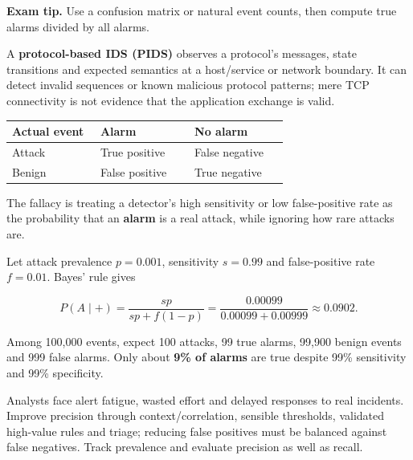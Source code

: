 \documentclass[11pt,a4paper]{article}
\begin{document}
{\color{ForestGreen}\textbf{Exam tip.} Use a confusion matrix or natural event counts,\allowbreak{} then compute true alarms divided by all alarms.}


A \textbf{protocol-based IDS (PIDS)} observes a protocol's messages,\allowbreak{} state transitions and expected semantics at a host/\allowbreak{}service or network boundary. It can detect invalid sequences or known malicious protocol patterns; mere TCP connectivity is not evidence that the application exchange is valid.



{\small\setlength{\tabcolsep}{3pt}
\begin{longtable}{>{\raggedright\arraybackslash}p{0.30327\linewidth}>{\raggedright\arraybackslash}p{0.32757\linewidth}>{\raggedright\arraybackslash}p{0.32757\linewidth}}
\toprule
\textbf{Actual event} & \textbf{Alarm} & \textbf{No alarm} \\
\midrule
\endhead
Attack & True positive & False negative \\
Benign & False positive & True negative \\
\bottomrule
\end{longtable}
}

The fallacy is treating a detector's high sensitivity or low false-positive rate as the probability that an \textbf{alarm} is a real attack,\allowbreak{} while ignoring how rare attacks are.


Let attack prevalence \(p=0.001\),\allowbreak{} sensitivity \(s=0.99\) and false-positive rate \(f=0.01\). Bayes' rule gives



\[
P(A\mid +)=\frac{sp}{sp+f(1-p)}=\frac{0.00099}{0.00099+0.00999}\approx 0.0902.
\]

Among 100,\allowbreak{}000 events,\allowbreak{} expect 100 attacks,\allowbreak{} 99 true alarms,\allowbreak{} 99,\allowbreak{}900 benign events and 999 false alarms. Only about \textbf{9\% of alarms} are true despite 99\% sensitivity and 99\% specificity.


Analysts face alert fatigue,\allowbreak{} wasted effort and delayed responses to real incidents. Improve precision through context/\allowbreak{}correlation,\allowbreak{} sensible thresholds,\allowbreak{} validated high-value rules and triage; reducing false positives must be balanced against false negatives. Track prevalence and evaluate precision as well as recall.




\clearpage
\end{document}
